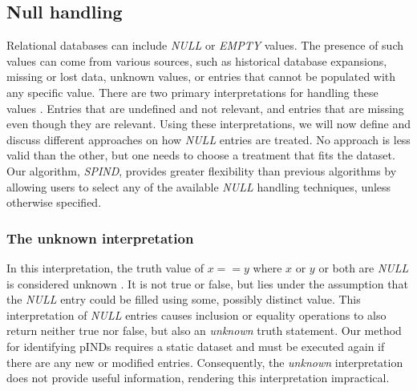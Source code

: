 \subsection{Null handling} \label{sec:null_handling}


Relational databases can include \textit{NULL} or \textit{EMPTY} values.
The presence of such values can come from various sources, such as historical database expansions, missing or lost data, unknown values, or entries that cannot be populated with any specific value. There are two primary interpretations for handling these values \cite{vassiliou1979null}.
Entries that are undefined and not relevant, and entries that are missing even though they are relevant. Using these interpretations, we will now define and discuss different approaches on how \textit{NULL} entries are treated. No approach is less valid than the other, but one needs to choose a treatment that fits the dataset. Our algorithm, \textit{SPIND}, provides greater flexibility than previous algorithms by allowing users to select any of the available \textit{NULL} handling techniques, unless otherwise specified.

\subsubsection{The \textbf{unknown} interpretation}
In this interpretation, the truth value of $x == y$ where $x$ or $y$ or both are \textit{NULL} is considered unknown \cite{codd1979extending}. It is not true or false, but lies under the assumption that the \textit{NULL} entry could be filled using some, possibly distinct value. This interpretation of \textit{NULL} entries causes inclusion or equality operations to also return neither true nor false, but also an \textit{unknown} truth statement. Our method for identifying pINDs requires a static dataset and must be executed again if there are any new or modified entries. Consequently, the \textit{unknown} interpretation does not provide useful information, rendering this interpretation impractical.

